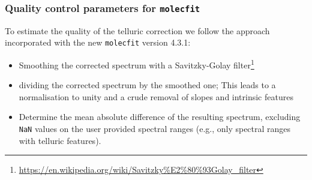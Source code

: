 \subsubsection{Quality control parameters for \texttt{molecfit}}\label{ssec:tellcorr_qc_params}


To estimate the quality of the telluric correction we follow the approach incorporated with the new \texttt{molecfit} version 4.3.1:
\begin{itemize}
    \item Smoothing the corrected spectrum with a Savitzky-Golay filter\footnote{\url{https://en.wikipedia.org/wiki/Savitzky\%E2\%80\%93Golay_filter}}
    \item dividing the corrected spectrum by the smoothed one; This leads to a normalisation to unity and a crude removal of slopes and intrinsic features
    \item Determine the mean absolute difference of the resulting spectrum, excluding \texttt{NaN} values on the user provided spectral ranges (e.g., only spectral ranges with telluric features). 
\end{itemize}
